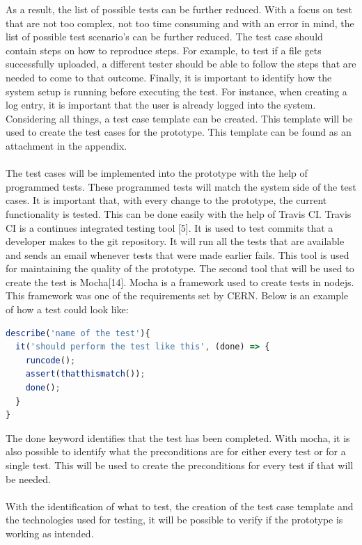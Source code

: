\documentclass[paper=a4, fontsize=11pt,twoside]{scrartcl}	%
\begin{document}
As a result, the list of possible tests can be further reduced. With a focus on test that are not too complex, not too time consuming and with an error in mind, the list of possible test scenario's can be further reduced.  The test case should contain steps on how to reproduce steps. For example, to test if a file gets successfully uploaded, a different tester should be able to follow the steps that are needed to come to that outcome. Finally, it is important to identify how the system setup is running before executing the test. For instance, when creating a log entry, it is important that the user is already logged into the system. Considering all things, a test case template can be created. This template will be used to create the test cases for the prototype. This template can be found as an attachment in the appendix. \\ \\
The test cases will be implemented into the prototype with the help of programmed tests. These programmed tests will match the system side of the test cases. It is important that, with every change to the prototype, the current functionality is tested. This can be done easily with the help of Travis CI. Travis CI is a continues integrated testing tool [5]. It is used to test commits that a developer makes to the git repository. It will run all the tests that are available and sends an email whenever tests that were made earlier fails. This tool is used for maintaining the quality of the prototype. The second tool that will be used to create the test is Mocha[14]. Mocha is a framework used to create tests in nodejs. This framework was one of the requirements set by CERN. Below is an example of how a test could look like:
\begin{lstlisting}[language=JavaScript, frame=single]
describe('name of the test'){
  it('should perform the test like this', (done) => {
    runcode();
    assert(thatthismatch());
    done();
  }
}
\end{lstlisting} 
The done keyword identifies that the test has been completed. With mocha, it is also possible to identify what the preconditions are for either every test or for a single test. This will be used to create the preconditions for every test if that will be needed.\\ \\
With the identification of what to test, the creation of the test case template and the technologies used for testing, it will be possible to verify if the prototype is working as intended.
\newpage
\end{document}
